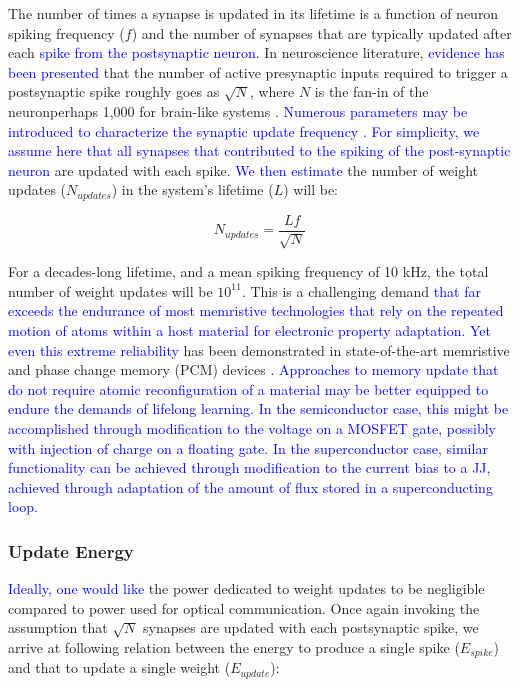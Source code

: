 \documentclass[twocolumn]{article}
\begin{document}
The number of times a synapse is updated in its lifetime is a function of neuron spiking frequency ($f$) and the number of synapses that are typically updated after each \textcolor{blue}{spike from the postsynaptic neuron}. In neuroscience literature, \textcolor{blue}{evidence has been presented} that the number of active presynaptic inputs required to trigger a postsynaptic spike roughly goes as $\sqrt{N}$, where $N$ is the fan-in of the neuron\textemdash perhaps 1,000 for brain-like systems \cite{vrso1996,vora2005}. \textcolor{blue}{Numerous parameters may be introduced to characterize the synaptic update frequency \cite{fuab2007}. For simplicity, we assume here that all synapses that contributed to the spiking of the post-synaptic neuron} are updated with each spike. \textcolor{blue}{We then estimate} the number of weight updates ($N_{updates}$) in the system's lifetime ($L$) will be:

\begin{equation}
    N_{updates} = \frac{Lf}{\sqrt{N}}
\end{equation}

For a decades-long lifetime, and a mean spiking frequency of 10 kHz, the total number of weight updates will be $10^{11}$. This is a challenging demand \textcolor{blue}{that far exceeds the endurance of most memristive technologies that rely on the repeated motion of atoms within a host material for electronic property adaptation. Yet even this extreme reliability} has been demonstrated in state-of-the-art memristive and phase change memory (PCM) devices \cite{zhao2020reliability}. \textcolor{blue}{Approaches to memory update that do not require atomic reconfiguration of a material may be better equipped to endure the demands of lifelong learning. In the semiconductor case, this might be accomplished through modification to the voltage on a MOSFET gate, possibly with injection of charge on a floating gate. In the superconductor case, similar functionality can be achieved through modification to the current bias to a JJ, achieved through adaptation of the amount of flux stored in a superconducting loop.}

\subsubsection{Update Energy}
\textcolor{blue}{Ideally, one would like} the power dedicated to weight updates to be negligible compared to power used for optical communication. Once again invoking the assumption that $\sqrt{N}$ synapses are updated with each postsynaptic spike, we arrive at following relation between the energy to produce a single spike ($E_{spike}$) and that to update a single weight ($E_{update}$):
\end{document}
